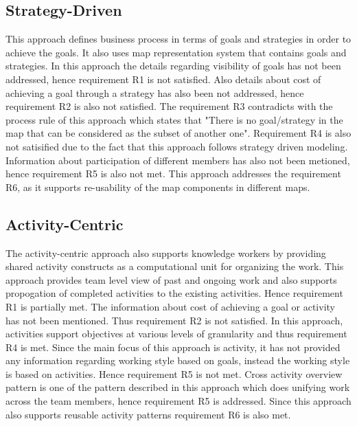 \subsection{Strategy-Driven} 
This approach \cite{Bider2005} defines business process in terms of goals and strategies in order to achieve the goals. It also uses map representation system that contains goals and strategies. In this approach the details regarding visibility of goals has not been addressed, hence requirement R1 is not satisfied. Also details about cost of achieving a goal through a strategy has also been not addressed, hence requirement R2 is also not satisfied. The requirement R3 contradicts with the process rule of this approach which states that "There is no goal/strategy in the map that can be considered as the subset of another one". Requirement R4 is also not satisified due to the fact that this approach follows strategy driven modeling. Information about participation of different members has also not been metioned, hence requirement R5 is also not met. This approach addresses the requirement R6, as it supports re-usability of the map components in different maps. 

\subsection{Activity-Centric} 
The activity-centric approach \cite{Yarosh2009} also supports knowledge workers by providing shared activity constructs as a computational unit for organizing the work. This approach provides team level view of past and ongoing work and also supports propogation of completed activities to the existing activities. Hence requirement R1 is partially met. The information about cost of achieving a goal or activity has not been mentioned. Thus requirement R2 is not satisfied. In this approach, activities support objectives at various levels of granularity and thus requirement R4 is met. Since the main focus of this approach is activity, it has not provided any information regarding working style based on goals, instead the working style is based on activities. Hence requirement R5 is not met. Cross activity overview pattern is one of the pattern described in this approach which does unifying work across the team members, hence requirement R5 is addressed. Since this approach also supports reusable activity patterns requirement R6 is also met. 
 
